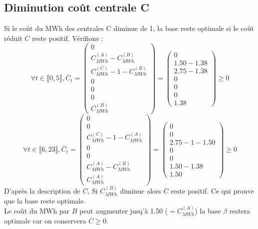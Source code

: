 \documentclass{article}
\begin{document}
\subsection{Diminution coût centrale C}
Si le coût du MWh des centrales C diminue de 1, la base reste optimale si le coût réduit $\overline{C}$ reste positif. Vérifions :
$$
\forall t \in \llbracket 0,5 \rrbracket,\overline{C}_t=
\left(
\begin{array}{c}
    0 \\
    C_{MWh}^{(A)} - C_{MWh}^{(B)} \\
    C_{MWh}^{(C)}-1 - C_{MWh}^{(B)} \\
    0 \\
    0 \\
    0 \\
    C_{MWh}^{(B)}
\end{array}
\right)=
\left(
\begin{array}{c}
    0 \\
    1.50-1.38 \\
    2.75-1.38 \\
    0 \\
    0 \\
    0 \\
    1.38
\end{array}
\right)
\geq 0
$$
$$
\forall t \in \llbracket 6,23 \rrbracket,\overline{C}_t=
\left(
\begin{array}{c}
    0 \\
    0 \\
    C_{MWh}^{(C)}-1 - C_{MWh}^{(A)} \\
    0 \\
    0 \\
    C_{MWh}^{(A)} - C_{MWh}^{(B)} \\
    C_{MWh}^{(A)}
\end{array}
\right)=
\left(
\begin{array}{c}
    0 \\
    0 \\
    2.75-1-1.50 \\
    0 \\
    0 \\
    1.50-1.38 \\
    1.50
\end{array}
\right)
\geq 0
$$
D'après la description de $\overline{C}$, Si $C_{MWh}^{(B)}$ diminue alors $\overline{C}$ reste positif. Ce qui prouve que la base reste optimale.\\
Le coût du MWh par $B$ peut augmenter jusq'à 1.50 ($=C_{MWh}^{(A)}$) la base $\beta$ restera optimale car on conservera $\overline{C}\geq 0$.
\end{document}
